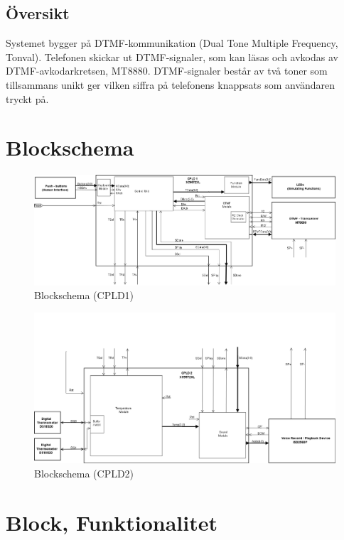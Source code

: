 \documentclass[a4paper,11pt]{article}
\begin{document}
	\subsection{Översikt}

	Systemet bygger på DTMF-kommunikation (Dual Tone Multiple Frequency, Tonval). Telefonen skickar ut DTMF-signaler, som kan
	läsas och avkodas av DTMF-avkodarkretsen, MT8880. DTMF-signaler består av två toner som tillsammans unikt ger vilken
	siffra på telefonens knappsats som användaren tryckt på. 
 

\section{Blockschema}

	\begin{figure}[h!]
	  \centering
	      \includegraphics[scale=0.48, angle=90]{BlockDiagramCPLD1.png}
	  	\caption{Blockschema (CPLD1)}
	\end{figure}

	\begin{figure}[h!]
	  \centering
	      \includegraphics[scale=0.48, angle=90]{BlockDiagramCPLD2.png}
	  	\caption{Blockschema (CPLD2)}
	\end{figure}

\section{Block, Funktionalitet}
\end{document}
